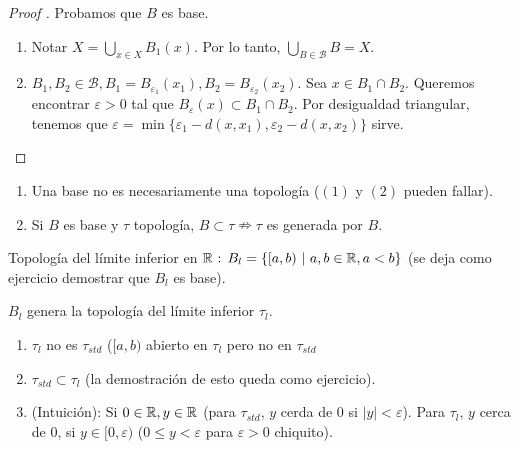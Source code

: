 \documentclass[a4paper]{report}
\begin{document}
	\begin{proof}[Proof ] Probamos que $B$ es base.
		\begin{enumerate}
			\item Notar $X = \bigcup_{x \in X} B_1 (x)$. Por lo tanto, $\bigcup_{B \in \mathcal{B}} B = X$.

			\item $B_1,B_2 \in \mathcal{B}, B_1 = B_{\varepsilon_1} (x_1), B_2 = B_{\varepsilon_2} (x_2)$. Sea $x \in B_1 \cap B_2$. Queremos encontrar $\varepsilon > 0$ tal que $B_{\varepsilon} (x) \subset B_1 \cap B_2$. Por desigualdad triangular, tenemos que $\varepsilon = \min \{ \varepsilon_1 - d(x,x_1), \varepsilon_2 - d(x,x_2) \}$ sirve.  
		\end{enumerate}
	\end{proof}

	\begin{note}
		\begin{enumerate}
			\item Una base no es necesariamente una topología ($(1)$ y $(2)$ pueden fallar).

			\item Si $B$ es base y $\tau$ topología, $B \subset \tau \nRightarrow \tau$ es generada por $B$.
		\end{enumerate}
	\end{note}

	\begin{eg}
		Topología del límite inferior en $\mathbb{R} \text{ : } B_l = \{ [a,b) \text{ | } a,b \in \mathbb{R} , a < b \}$ (se deja como ejercicio demostrar que $B_l$ es base).
	\end{eg}

	\begin{definition}
		$B_l$ genera la topología del límite inferior $\tau_l$.
	\end{definition}

	\begin{remark} \text{}
		\begin{enumerate}
			\item $\tau_l$ no es $\tau_{std}$ ($[a,b)$ abierto en $\tau_l$ pero no en $\tau_{std}$

			\item $\tau_{std} \subset \tau_l$ (la demostración de esto queda como ejercicio).

			\item (Intuición): Si $0 \in \mathbb{R}, y \in \mathbb{R}$ (para $\tau_{std}$, $y$ cerda de $0$ si $|y| < \varepsilon$). Para $\tau_l$, $y$ cerca de $0$, si $y \in [0,\varepsilon)$ ($0\leq y < \varepsilon$ para $\varepsilon > 0$ chiquito).
		\end{enumerate}
	\end{remark}
\end{document}
